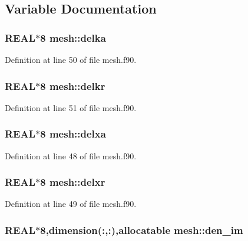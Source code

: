\subsection{Variable Documentation}
\hypertarget{namespacemesh_a93c5cfe69a9cda5c977adaf99030481d}{
\subsubsection[{delka}]{\setlength{\rightskip}{0pt plus 5cm}REAL$\ast$8 {\bf mesh::delka}}}
\label{namespacemesh_a93c5cfe69a9cda5c977adaf99030481d}


Definition at line 50 of file mesh.f90.

\hypertarget{namespacemesh_a30ce8cdfbc09510b555134e5ee1c2472}{
\subsubsection[{delkr}]{\setlength{\rightskip}{0pt plus 5cm}REAL$\ast$8 {\bf mesh::delkr}}}
\label{namespacemesh_a30ce8cdfbc09510b555134e5ee1c2472}


Definition at line 51 of file mesh.f90.

\hypertarget{namespacemesh_a4bbd964b605a9fedc6fd4b5feaf2d226}{
\subsubsection[{delxa}]{\setlength{\rightskip}{0pt plus 5cm}REAL$\ast$8 {\bf mesh::delxa}}}
\label{namespacemesh_a4bbd964b605a9fedc6fd4b5feaf2d226}


Definition at line 48 of file mesh.f90.

\hypertarget{namespacemesh_a8517784a828d82832ad38e911e58cdf1}{
\subsubsection[{delxr}]{\setlength{\rightskip}{0pt plus 5cm}REAL$\ast$8 {\bf mesh::delxr}}}
\label{namespacemesh_a8517784a828d82832ad38e911e58cdf1}


Definition at line 49 of file mesh.f90.

\hypertarget{namespacemesh_a88e07a02f831434825843fa4d74b7bc0}{
\subsubsection[{den\_\-im}]{\setlength{\rightskip}{0pt plus 5cm}REAL$\ast$8,dimension(:,:),allocatable {\bf mesh::den\_\-im}}}
\label{namespacemesh_a88e07a02f831434825843fa4d74b7bc0}


